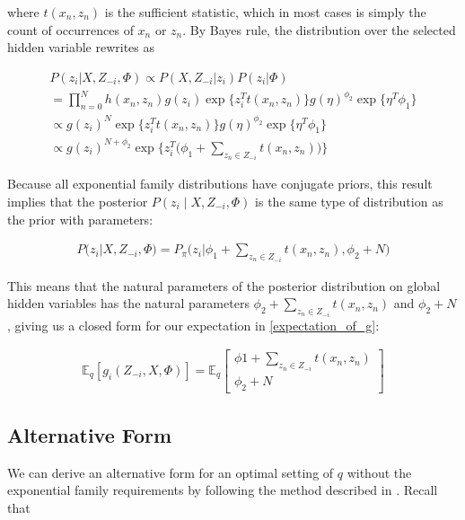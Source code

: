 where $t(x_n, z_n)$ is the sufficient statistic, which in most cases is simply the count of occurrences of $x_n$ or $z_n$. By Bayes rule, the distribution over the selected hidden variable rewrites as  

\begin{align}
\nonumber P(z_i | X, Z_{-i}, \Phi) \propto P(X,Z_{-i} | z_i)P(z_i|\Phi) \\
\nonumber = \prod\limits_{n=0}^N  h(x_n, z_n) g(z_i)\exp\big\{z_i^T t(x_n, z_n)\big\}  g(\eta)^{\phi_2}\exp\big\{\eta^T\phi_1 \big\} \\
\nonumber \propto g(z_i)^N \exp\big\{z_i^T t(x_n, z_n)\big\}  g(\eta)^{\phi_2}\exp\big\{\eta^T\phi_1 \big\} \\
\propto g(z_i)^{N+\phi_2} \exp\bigg\{z_i^T \big(\phi_1 + \sum\limits_{z_n \in Z_{-i}} t(x_n, z_n)\big)\bigg\}
\end{align}

Because all exponential family distributions have conjugate priors, this result implies that the posterior $P(z_i \mid X, Z_{-i}, \Phi)$ is the same type of distribution as the prior with parameters:

\begin{align}
P(z_i | X,Z_{-i},\Phi) = P_{\pi}\big(z_i | \phi_1 + \sum\limits_{z_n \in Z_{-i}} t(x_n, z_n), \phi_2 + N\big)
\end{align}

This means that the natural parameters of the posterior distribution on global hidden variables has the natural parameters $\phi_2 + \sum\limits_{z_n \in Z_{-i}} t(x_n, z_n)$ and $\phi_2 + N$, giving us a closed form for our expectation in \eqref{expectation_of_g}: 

\begin{align}
\mathbb{E}_q[g_i(Z_{-i}, X, \Phi)] = \mathbb{E}_q \begin{bmatrix} \phi1 + \sum\limits_{z_n \in Z_{-i}} t(x_n, z_n) \\ \phi_2 + N \end{bmatrix}
\end{align}

\citep{hoffman:2013}



\subsection{Alternative Form}
We can derive an alternative form for an optimal setting of $q$ without the exponential family requirements by following the method described in \citet{bishop:2006}. Recall that 

